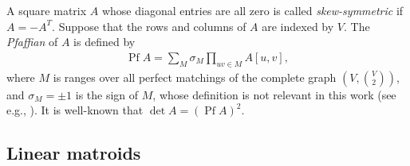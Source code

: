 \documentclass{theoretics}
\DeclareMathOperator{\Pf}{Pf}
\begin{document}
A square matrix $A$ whose diagonal entries are all zero is called \emph{skew-symmetric} if $A = -A^T$.
Suppose that the rows and columns of $A$ are indexed by $V$.
The \emph{Pfaffian} of $A$ is defined by
\begin{align*}
  \Pf A = \sum_{M} \sigma_M \prod_{uv \in M} A[u, v],
\end{align*}
where $M$ is ranges over all perfect matchings of the complete graph $(V, \binom{V}{2})$, and $\sigma_M = \pm 1$ is the sign of $M$, whose definition is not relevant in this work (see e.g., \cite{murota1999matrices}).
It is well-known that $\det A = (\Pf A)^2$.

\subsection{Linear matroids}
\label{sec:prel-matroids}
\end{document}
